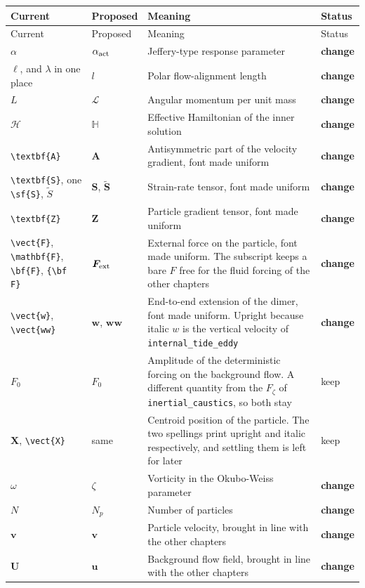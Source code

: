 \documentclass[11pt,a4paper]{article}
\newcommand{\mb}[1]{\mathbb{#1}}
\renewcommand{\vec}[1]{\boldsymbol{#1}}
\newcommand{\chg}{\textbf{change}}
\newcommand{\kp}{keep}
\begin{document}
\begin{longtable}{@{}p{3.1cm} p{3.1cm} p{8.6cm} p{1.6cm}@{}}
\toprule
Current & Proposed & Meaning & Status \\
\midrule
\endfirsthead
\toprule
Current & Proposed & Meaning & Status \\
\midrule
\endhead
$\alpha$ & $\alpha_{\rm act}$ & Jeffery-type response parameter & \chg \\
$\ell$, and $\lambda$ in one place & $l$ & Polar flow-alignment length & \chg \\
$L$ & $\mathscr{L}$ & Angular momentum per unit mass & \chg \\
$\mathcal{H}$ & $\mb{H}$ & Effective Hamiltonian of the inner solution & \chg \\
\verb|\textbf{A}| & $\mathbf{A}$ & Antisymmetric part of the velocity gradient, font made uniform & \chg \\
\verb|\textbf{S}|, one \verb|\sf{S}|, $\tilde{S}$ & $\mathbf{S}$, $\tilde{\mathbf{S}}$ & Strain-rate tensor, font made uniform & \chg \\
\verb|\textbf{Z}| & $\mathbf{Z}$ & Particle gradient tensor, font made uniform & \chg \\
\verb|\vect{F}|, \verb|\mathbf{F}|, \verb|\bf{F}|, \verb|{\bf F}| & $\vec{F}_{\rm ext}$ & External force on the particle, font made uniform. The subscript keeps a bare $F$ free for the fluid forcing of the other chapters & \chg \\
\verb|\vect{w}|, \verb|\vect{ww}| & $\mathbf{w}$, $\mathbf{ww}$ & End-to-end extension of the dimer, font made uniform. Upright because italic $w$ is the vertical velocity of \texttt{internal\_tide\_eddy} & \chg \\
$F_0$ & $F_0$ & Amplitude of the deterministic forcing on the background flow. A different quantity from the $F_\zeta$ of \texttt{inertial\_caustics}, so both stay & \kp \\
$\mathbf{X}$, \verb|\vect{X}| & same & Centroid position of the particle. The two spellings print upright and italic respectively, and settling them is left for later & \kp \\
$\omega$ & $\zeta$ & Vorticity in the Okubo-Weiss parameter & \chg \\
$N$ & $N_p$ & Number of particles & \chg \\
$\mathbf{v}$ & $\vec{v}$ & Particle velocity, brought in line with the other chapters & \chg \\
$\mathbf{U}$ & $\vec{u}$ & Background flow field, brought in line with the other chapters & \chg \\

\end{longtable}
\end{document}
